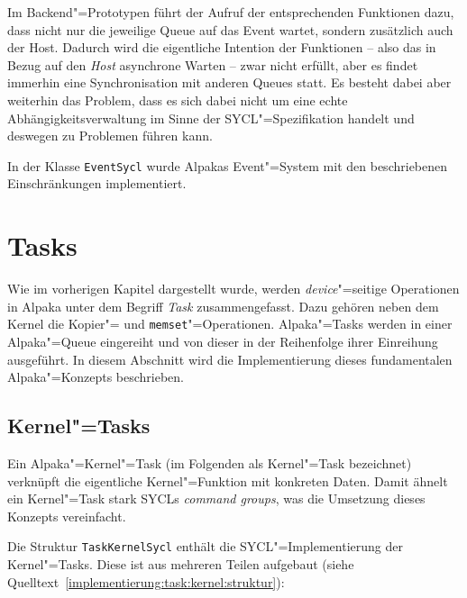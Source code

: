 Im Backend"=Prototypen führt der Aufruf der entsprechenden Funktionen dazu, dass
nicht nur die jeweilige Queue auf das Event wartet, sondern zusätzlich auch der
Host. Dadurch wird die eigentliche Intention der Funktionen -- also das in Bezug
auf den \textit{Host} asynchrone Warten -- zwar nicht erfüllt, aber es findet
immerhin eine Synchronisation mit anderen Queues statt. Es besteht dabei aber
weiterhin das Problem, dass es sich dabei nicht um eine echte
Abhängigkeitsverwaltung im Sinne der SYCL"=Spezifikation handelt und deswegen zu
Problemen führen kann.

In der Klasse \texttt{EventSycl} wurde Alpakas Event"=System mit den
beschriebenen Einschränkungen implementiert.

\section{Tasks}
\label{implementierung:task}

Wie im vorherigen Kapitel dargestellt wurde, werden \textit{device}"=seitige
Operationen in Alpaka unter dem Begriff \textit{Task} zusammengefasst. Dazu
gehören neben dem Kernel die Kopier"= und \texttt{memset}"=Operationen.
Alpaka"=Tasks werden in einer Alpaka"=Queue eingereiht und von dieser in der
Reihenfolge ihrer Einreihung ausgeführt. In diesem Abschnitt wird die
Implementierung dieses fundamentalen Alpaka"=Konzepts beschrieben.

\subsection{Kernel"=Tasks}
\label{implementierung:task:kernel}

Ein Alpaka"=Kernel"=Task (im Folgenden als Kernel"=Task bezeichnet) verknüpft
die eigentliche Kernel"=Funktion mit konkreten Daten. Damit ähnelt ein
Kernel"=Task stark SYCLs \textit{command groups}, was die Umsetzung dieses
Konzepts vereinfacht.

Die Struktur \texttt{TaskKernelSycl} enthält die SYCL"=Implementierung der
Kernel"=Tasks. Diese ist aus mehreren Teilen aufgebaut (siehe
Quelltext~\ref{implementierung:task:kernel:struktur}):

